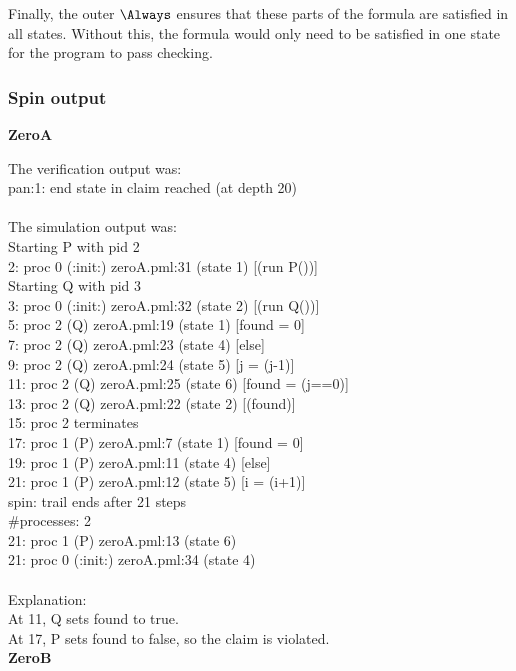 \documentclass[12pt,a4paper]{scrartcl}
\begin{document}
Finally, the outer \(\Always\) ensures that these parts of the formula are satisfied in all states. Without this, the formula would only need to be satisfied in one state for the program to pass checking.

\subsubsection{Spin output}
\textbf{ZeroA}

The verification output was:\\
pan:1: end state in claim reached (at depth 20)\\
\\
The simulation output was:\\
Starting P with pid 2\\
  2:    proc  0 (:init:) zeroA.pml:31 (state 1) [(run P())]\\
Starting Q with pid 3\\
  3:    proc  0 (:init:) zeroA.pml:32 (state 2) [(run Q())]\\
  5:    proc  2 (Q) zeroA.pml:19 (state 1)  [found = 0]\\
  7:    proc  2 (Q) zeroA.pml:23 (state 4)  [else]\\
  9:    proc  2 (Q) zeroA.pml:24 (state 5)  [j = (j-1)]\\
 11:    proc  2 (Q) zeroA.pml:25 (state 6)  [found = (j==0)]\\
 13:    proc  2 (Q) zeroA.pml:22 (state 2)  [(found)]\\
 15: proc 2 terminates\\
 17:    proc  1 (P) zeroA.pml:7 (state 1)   [found = 0]\\
 19:    proc  1 (P) zeroA.pml:11 (state 4)  [else]\\
 21:    proc  1 (P) zeroA.pml:12 (state 5)  [i = (i+1)]\\
spin: trail ends after 21 steps\\
\#processes: 2\\
 21:    proc  1 (P) zeroA.pml:13 (state 6)\\
 21:    proc  0 (:init:) zeroA.pml:34 (state 4)\\
\\
Explanation:\\
At 11, Q sets found to true. \\
At 17, P sets found to false, so the claim is violated.\\

\textbf{ZeroB}
\end{document}
